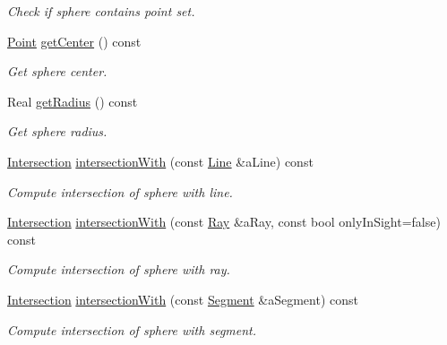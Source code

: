 \begin{DoxyCompactItemize}
\begin{DoxyCompactList}\small\item\em Check if sphere contains point set. \end{DoxyCompactList}\item 
\hyperlink{classlibrary_1_1math_1_1geom_1_1d3_1_1objects_1_1_point}{Point} \hyperlink{classlibrary_1_1math_1_1geom_1_1d3_1_1objects_1_1_sphere_a871367ab75aa46194a6b8ddc8a45967f}{get\+Center} () const
\begin{DoxyCompactList}\small\item\em Get sphere center. \end{DoxyCompactList}\item 
Real \hyperlink{classlibrary_1_1math_1_1geom_1_1d3_1_1objects_1_1_sphere_a48cfc72b6eec9a953fb837a13e1df45e}{get\+Radius} () const
\begin{DoxyCompactList}\small\item\em Get sphere radius. \end{DoxyCompactList}\item 
\hyperlink{classlibrary_1_1math_1_1geom_1_1d3_1_1_intersection}{Intersection} \hyperlink{classlibrary_1_1math_1_1geom_1_1d3_1_1objects_1_1_sphere_a6cee64ab56c136802a08d7b5403b80ac}{intersection\+With} (const \hyperlink{classlibrary_1_1math_1_1geom_1_1d3_1_1objects_1_1_line}{Line} \&a\+Line) const
\begin{DoxyCompactList}\small\item\em Compute intersection of sphere with line. \end{DoxyCompactList}\item 
\hyperlink{classlibrary_1_1math_1_1geom_1_1d3_1_1_intersection}{Intersection} \hyperlink{classlibrary_1_1math_1_1geom_1_1d3_1_1objects_1_1_sphere_a2d142839c409faebccc36999d464e3bd}{intersection\+With} (const \hyperlink{classlibrary_1_1math_1_1geom_1_1d3_1_1objects_1_1_ray}{Ray} \&a\+Ray, const bool only\+In\+Sight=false) const
\begin{DoxyCompactList}\small\item\em Compute intersection of sphere with ray. \end{DoxyCompactList}\item 
\hyperlink{classlibrary_1_1math_1_1geom_1_1d3_1_1_intersection}{Intersection} \hyperlink{classlibrary_1_1math_1_1geom_1_1d3_1_1objects_1_1_sphere_a49323ca9a05b902b57011631eb0b5b57}{intersection\+With} (const \hyperlink{classlibrary_1_1math_1_1geom_1_1d3_1_1objects_1_1_segment}{Segment} \&a\+Segment) const
\begin{DoxyCompactList}\small\item\em Compute intersection of sphere with segment. \end{DoxyCompactList}\item 

\end{DoxyCompactItemize}
